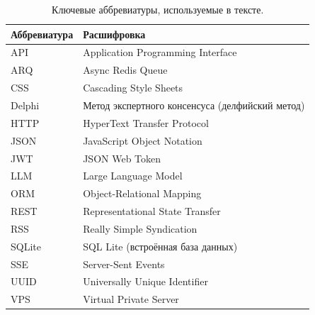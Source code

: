\begin{table}[h]
\centering
\small
\begin{tabular}{|l|l|}
\hline
\textbf{Аббревиатура} & \textbf{Расшифровка} \\
\hline
API & Application Programming Interface \\
ARQ & Async Redis Queue \\
CSS & Cascading Style Sheets \\
Delphi & Метод экспертного консенсуса (делфийский метод) \\
HTTP & HyperText Transfer Protocol \\
JSON & JavaScript Object Notation \\
JWT & JSON Web Token \\
LLM & Large Language Model \\
ORM & Object-Relational Mapping \\
REST & Representational State Transfer \\
RSS & Really Simple Syndication \\
SQLite & SQL Lite (встроённая база данных) \\
SSE & Server-Sent Events \\
UUID & Universally Unique Identifier \\
VPS & Virtual Private Server \\
\hline
\end{tabular}
\caption{Ключевые аббревиатуры, используемые в тексте.}
\label{tab:abbrev}
\end{table}

